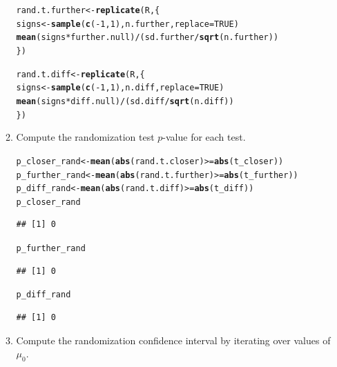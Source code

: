 \documentclass{article}\usepackage[]{graphicx}\usepackage[]{xcolor}
\makeatletter
\newcommand{\hlnum}[1]{\textcolor[rgb]{0.686,0.059,0.569}{#1}}%
\newcommand{\hlopt}[1]{\textcolor[rgb]{0,0,0}{#1}}%
\newcommand{\hldef}[1]{\textcolor[rgb]{0.345,0.345,0.345}{#1}}%
\newcommand{\hlkwb}[1]{\textcolor[rgb]{0.69,0.353,0.396}{#1}}%
\newcommand{\hlkwc}[1]{\textcolor[rgb]{0.333,0.667,0.333}{#1}}%
\newcommand{\hlkwd}[1]{\textcolor[rgb]{0.737,0.353,0.396}{\textbf{#1}}}%
\newenvironment{kframe}{%
 \def\at@end@of@kframe{}%
 \ifinner\ifhmode%
  \def\at@end@of@kframe{\end{minipage}}%
  \begin{minipage}{\columnwidth}%
 \fi\fi%
 \def\FrameCommand##1{\hskip\@totalleftmargin \hskip-\fboxsep
 \colorbox{shadecolor}{##1}\hskip-\fboxsep
     \hskip-\linewidth \hskip-\@totalleftmargin \hskip\columnwidth}%
 \MakeFramed {\advance\hsize-\width
   \@totalleftmargin\z@ \linewidth\hsize
   \@setminipage}}%
 {\par\unskip\endMakeFramed%
 \at@end@of@kframe}
\newenvironment{knitrout}{}{} %
\makeatother
\begin{document}
\begin{enumerate}
\begin{enumerate}
\begin{knitrout}
\begin{kframe}
\begin{alltt}
\hldef{rand.t.further} \hlkwb{<-} \hlkwd{replicate}\hldef{(R, \{}
  \hldef{signs} \hlkwb{<-} \hlkwd{sample}\hldef{(}\hlkwd{c}\hldef{(}\hlopt{-}\hlnum{1}\hldef{,}\hlnum{1}\hldef{), n.further,} \hlkwc{replace} \hldef{=} \hlnum{TRUE}\hldef{)}
  \hlkwd{mean}\hldef{(signs} \hlopt{*} \hldef{further.null)} \hlopt{/} \hldef{(sd.further} \hlopt{/} \hlkwd{sqrt}\hldef{(n.further))}
\hldef{\})}

\hldef{rand.t.diff} \hlkwb{<-} \hlkwd{replicate}\hldef{(R, \{}
  \hldef{signs} \hlkwb{<-} \hlkwd{sample}\hldef{(}\hlkwd{c}\hldef{(}\hlopt{-}\hlnum{1}\hldef{,}\hlnum{1}\hldef{), n.diff,} \hlkwc{replace} \hldef{=} \hlnum{TRUE}\hldef{)}
  \hlkwd{mean}\hldef{(signs} \hlopt{*} \hldef{diff.null)}    \hlopt{/} \hldef{(sd.diff}    \hlopt{/} \hlkwd{sqrt}\hldef{(n.diff))}
\hldef{\})}
\end{alltt}
\end{kframe}
\end{knitrout}
\item Compute the randomization test $p$-value for each test.
\begin{knitrout}\scriptsize
{}\color{fgcolor}\begin{kframe}
\begin{alltt}
\hldef{p_closer_rand}  \hlkwb{<-} \hlkwd{mean}\hldef{(}\hlkwd{abs}\hldef{(rand.t.closer)}  \hlopt{>=} \hlkwd{abs}\hldef{(t_closer))}
\hldef{p_further_rand} \hlkwb{<-} \hlkwd{mean}\hldef{(}\hlkwd{abs}\hldef{(rand.t.further)} \hlopt{>=} \hlkwd{abs}\hldef{(t_further))}
\hldef{p_diff_rand}    \hlkwb{<-} \hlkwd{mean}\hldef{(}\hlkwd{abs}\hldef{(rand.t.diff)}    \hlopt{>=} \hlkwd{abs}\hldef{(t_diff))}
\hldef{p_closer_rand}
\end{alltt}
\begin{verbatim}
## [1] 0
\end{verbatim}
\begin{alltt}
\hldef{p_further_rand}
\end{alltt}
\begin{verbatim}
## [1] 0
\end{verbatim}
\begin{alltt}
\hldef{p_diff_rand}
\end{alltt}
\begin{verbatim}
## [1] 0
\end{verbatim}
\end{kframe}
\end{knitrout}
  \item Compute the randomization confidence interval by iterating over values of $\mu_0$.\\

\end{enumerate}
\end{enumerate}
\end{document}
